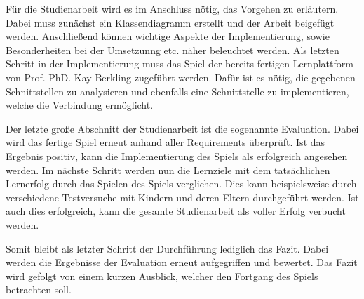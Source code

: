 	Für die Studienarbeit wird es im Anschluss nötig, das Vorgehen zu erläutern. Dabei muss zunächst ein Klassendiagramm erstellt und der Arbeit beigefügt werden. Anschließend können wichtige Aspekte der Implementierung, sowie Besonderheiten bei der Umsetzunng etc. näher beleuchtet werden.
	Als letzten Schritt in der Implementierung muss das Spiel der bereits fertigen Lernplattform von Prof. PhD. Kay Berkling zugeführt werden. Dafür ist es nötig, die gegebenen Schnittstellen zu analysieren und ebenfalls eine Schnittstelle zu implementieren, welche die Verbindung ermöglicht.

	Der letzte große Abschnitt der Studienarbeit ist die sogenannte Evaluation. Dabei wird das fertige Spiel erneut anhand aller Requirements überprüft. Ist das Ergebnis positiv, kann die Implementierung des Spiels als erfolgreich angesehen werden.
	Im nächste Schritt werden nun die Lernziele mit dem tatsächlichen Lernerfolg durch das Spielen des Spiels verglichen. Dies kann beispielsweise durch verschiedene Testversuche mit Kindern und deren Eltern durchgeführt werden. Ist auch dies erfolgreich, kann die gesamte Studienarbeit als voller Erfolg verbucht werden.

	Somit bleibt als letzter Schritt der Durchführung lediglich das Fazit. Dabei werden die Ergebnisse der Evaluation erneut aufgegriffen und bewertet. Das Fazit wird gefolgt von einem kurzen Ausblick, welcher den Fortgang des Spiels betrachten soll.